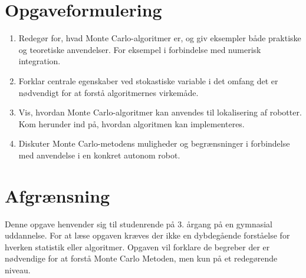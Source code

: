 \documentclass[../../SRP.tex]{subfiles}
\begin{document}
\section{Opgaveformulering}
  \begin{enumerate}[label=(\Roman*)]
  \item Redegør for, hvad Monte Carlo-algoritmer er, og giv eksempler både praktiske og teoretiske anvendelser. For eksempel i forbindelse med numerisk integration.

  \item Forklar centrale egenskaber ved stokastiske variable i det omfang det er nødvendigt for at forstå algoritmernes virkemåde.

  \item Vis, hvordan Monte Carlo-algoritmer kan anvendes til lokalisering af robotter. Kom herunder ind på, hvordan algoritmen kan implementeres.

  \item Diskuter Monte Carlo-metodens muligheder og begrænsninger i forbindelse med anvendelse i en konkret autonom robot.
  \end{enumerate}

\section{Afgrænsning}
Denne opgave henvender sig til studenrende på 3. årgang på en gymnasial uddannelse. For at læse opgaven kræves der ikke en dybdegående forståelse for hverken statistik eller algoritmer.  Opgaven vil forklare de begreber der er nødvendige for at forstå Monte Carlo Metoden, men kun på et redegørende niveau. 
\end{document}
